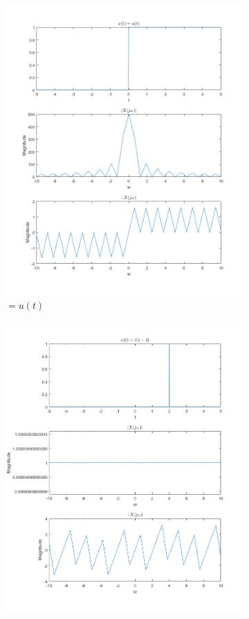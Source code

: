 \documentclass[11pt]{article}
\begin{document}
\begin{figure}
\begin{subfigure}[b]{.3\linewidth}
\includegraphics[width=\linewidth]{q2d}
\caption{$ = u(t)$}
\end{subfigure}
\begin{subfigure}[b]{.3\linewidth}
\includegraphics[width=\linewidth]{q2e}

\end{subfigure}
\end{figure}
\end{document}
